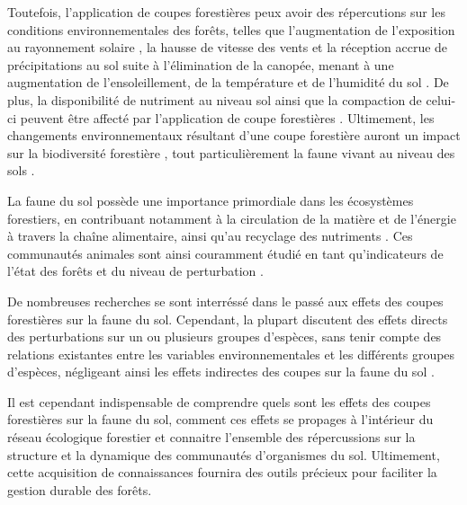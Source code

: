 Toutefois, l'application de coupes forestières peux avoir des répercutions sur les conditions environnementales des forêts, 
telles que l'augmentation de l'exposition au rayonnement solaire , la hausse de vitesse des vents et la réception accrue de précipitations au sol suite à l'élimination de la canopée, 
menant à une augmentation de l'ensoleillement, de la température et de l'humidité du sol \citep{Keenan1993ecologicaleffects,Lindo2003Microbialbiomass,Heithecker2007Edgerelatedgradients}.
De plus, la disponibilité de nutriment au niveau sol ainsi que la compaction de celui-ci peuvent être affecté par l'application de coupe forestières \citep{Battigelli2004Shorttermimpact,Covington1981Changesforest,Lindo2003Microbialbiomass,rousseauLongtermEffectsBiomass2018}. 
Ultimement, les changements environnementaux résultant d'une coupe forestière auront un impact sur la biodiversité forestière \citep{Chaudhary2016Impactforest,Fedrowitz2014Canretention,Paillet2010Biodiversitydifferences}, 
tout particulièrement la faune vivant au niveau des sols \citep{Chaudhary2016ImpactforestLindo2003Microbialbiomass,Kudrin2023metaanalysiseffects}.

La faune du sol possède une importance primordiale dans les écosystèmes forestiers, en contribuant notamment à la circulation de la matière et de l'énergie à travers la chaîne alimentaire, ainsi qu'au recyclage des nutriments \citep{Kudrin2023metaanalysiseffects}.
Ces communautés animales sont ainsi couramment étudié en tant qu'indicateurs de l'état des forêts et du niveau de perturbation \citep{birdChangesSoilLitter2004,Maleque2009Arthropodsbioindicators,pongeVerticalDistributionCollembola2000,}.

De nombreuses recherches se sont interréssé dans le passé aux effets des coupes forestières sur la faune du sol. 
Cependant, la plupart discutent des effets directs des perturbations sur un ou plusieurs groupes d'espèces, 
sans tenir compte des relations existantes entre les variables environnementales et les différents groupes d'espèces, 
négligeant ainsi les effets indirectes des coupes sur la faune du sol \citep{graceStructuralEquationModeling2008,josephIntegratingOccupancyModels2016,Kudrin2023MetaAnalysisEffects,Pollierer2021Diversityfunctional}. 

Il est cependant indispensable de comprendre quels sont les effets des coupes forestières sur la faune du sol, 
comment ces effets se propages à l'intérieur du réseau écologique forestier et connaitre l'ensemble des répercussions sur la structure 
et la dynamique des communautés d'organismes du sol. 
Ultimement, cette acquisition de connaissances fournira des outils précieux pour faciliter la gestion durable des forêts.

